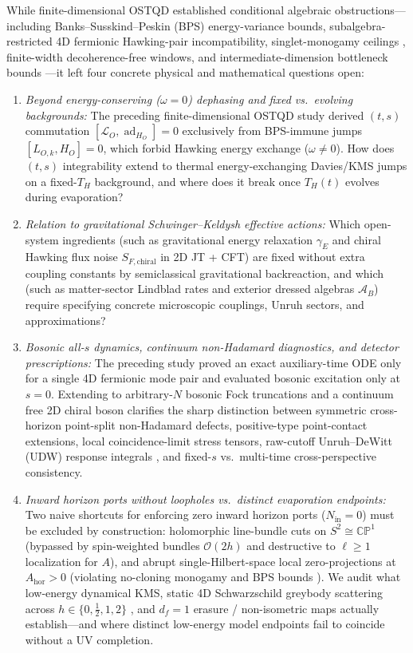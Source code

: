 \documentclass[11pt,a4paper]{article}
\theoremstyle{definition}
\theoremstyle{remark}
\newcommand{\ad}{\operatorname{ad}}
\newcommand{\cA}{\mathcal{A}}
\newcommand{\cL}{\mathcal{L}}
\newcommand{\1}{\mathbf{1}}
\begin{document}
While finite-dimensional OSTQD established conditional algebraic obstructions---including Banks--Susskind--Peskin (BPS) \cite{BPS1984} energy-variance bounds, subalgebra-restricted 4D fermionic Hawking-pair incompatibility, singlet-monogamy ceilings \cite{Kay2009}, finite-width decoherence-free windows, and intermediate-dimension bottleneck bounds \cite{Soga2026OSTQD,FarberGour2026}---it left four concrete physical and mathematical questions open:
\begin{enumerate}
  \item \emph{Beyond energy-conserving ($\omega=0$) dephasing and fixed vs.\ evolving backgrounds:} The preceding finite-dimensional OSTQD study \cite{Soga2026OSTQD} derived $(t,s)$ commutation $[\cL_O, \ad_{H_O}]=0$ exclusively from BPS-immune jumps $[L_{O,k}, H_O]=0$, which forbid Hawking energy exchange ($\omega \neq 0$). How does $(t,s)$ integrability extend to thermal energy-exchanging Davies/KMS jumps on a fixed-$T_H$ background, and where does it break once $T_H(t)$ evolves during evaporation?
  \item \emph{Relation to gravitational Schwinger--Keldysh effective actions:} Which open-system ingredients (such as gravitational energy relaxation $\gamma_E$ and chiral Hawking flux noise $S_{F,\mathrm{chiral}}$ in 2D JT + CFT) are fixed without extra coupling constants by semiclassical gravitational backreaction, and which (such as matter-sector Lindblad rates and exterior dressed algebras $\cA_B$) require specifying concrete microscopic couplings, Unruh sectors, and approximations?
  \item \emph{Bosonic all-$s$ dynamics, continuum non-Hadamard diagnostics, and detector prescriptions:} The preceding study \cite{Soga2026OSTQD} proved an exact auxiliary-time ODE only for a single 4D fermionic mode pair and evaluated bosonic excitation only at $s=0$. Extending to arbitrary-$N$ bosonic Fock truncations and a continuum free 2D chiral boson clarifies the sharp distinction between symmetric cross-horizon point-split non-Hadamard defects, positive-type point-contact extensions, local coincidence-limit stress tensors, raw-cutoff Unruh--DeWitt (UDW) response integrals \cite{LoukoSatz2008,Louko2014}, and fixed-$s$ vs.\ multi-time cross-perspective consistency.
  \item \emph{Inward horizon ports without loopholes vs.\ distinct evaporation endpoints:} Two naive shortcuts for enforcing zero inward horizon ports ($N_{\mathrm{in}}=0$) must be excluded by construction: holomorphic line-bundle cuts on $S^2\cong\mathbb{CP}^1$ (bypassed by spin-weighted bundles $\mathcal{O}(2h)$ \cite{NewmanPenrose1966} and destructive to $\ell\ge 1$ localization for $A$), and abrupt single-Hilbert-space local zero-projections at $A_{\mathrm{hor}}>0$ (violating no-cloning monogamy and BPS bounds \cite{Soga2026OSTQD}). We audit what low-energy dynamical KMS, static 4D Schwarzschild greybody scattering across $h\in\{0,\frac{1}{2},1,2\}$ \cite{ReggeWheeler1957,Zerilli1970,Teukolsky1973,Unruh1976Abs,Page1976,DasGibbonsMathur1997,Crispino2007}, and $d_f=1$ erasure / non-isometric maps \cite{Akers2022} actually establish---and where distinct low-energy model endpoints fail to coincide without a UV completion.
\end{enumerate}
\end{document}
